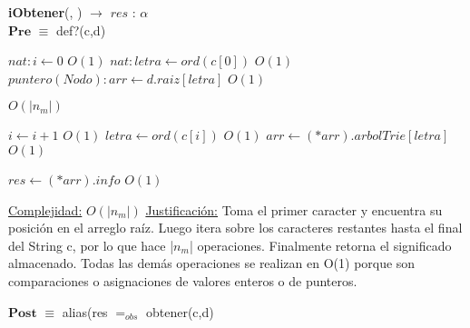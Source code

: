 \begin{algorithm}[H]{\textbf{iObtener}(, ) $\to$ $res$ : $\alpha$}
	{\\ $\textbf{Pre}$ $\equiv$ def?(c,d)}
	\begin{algorithmic}

		\State $nat: i \gets 0$ \Comment $O(1)$
		\State $nat: letra \gets ord(c[0])$ \Comment $O(1)$
		\State $puntero(Nodo): arr \gets d.raiz[letra]$ \Comment $O(1)$

		 \Comment $O(|n_m|)$

			\State $i \gets i + 1$ \Comment $O(1)$
			\State $letra \gets ord(c[i])$ \Comment $O(1)$
			\State $arr \gets (*arr).arbolTrie[letra]$ \Comment $O(1)$

		\EndWhile

		\State $res \gets (*arr).info$ \Comment $O(1)$

		\medskip
		\Statex \underline{Complejidad:} $O(|n_m|)$
		\Statex \underline{Justificación:} Toma el primer caracter y encuentra su posición en el arreglo raíz. Luego itera sobre los caracteres restantes hasta el final del String c, por lo que hace |$n_m$| operaciones. Finalmente retorna el significado almacenado. Todas las demás operaciones se realizan en O(1) porque son comparaciones o asignaciones de valores enteros o de punteros.

    \end{algorithmic}
    {$\textbf{Post}$ $\equiv$ alias(res $=_{obs}$ obtener(c,d)}
\end{algorithm}


